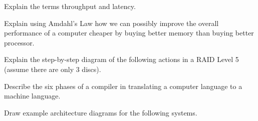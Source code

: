 \documentclass[12pt]{exam}
\begin{document}
\newpage
\begin{questions}

\question[20] Explain the terms throughput and latency. 
\addpoints

\question[20] 
Explain using Amdahl's Law  how we can possibly improve the overall performance of a computer  cheaper by buying better memory than buying better processor. 
\addpoints

\question [20] Explain the step-by-step diagram of the following actions in a RAID Level 5 (assume there are only 3 discs). 
\noaddpoints %
\addpoints


\question [20] 
Describe the six phases of a compiler in translating a computer language to a machine language. 
\addpoints

\question [5] Draw example architecture diagrams for the following systems.
\noaddpoints 
{}
\addpoints
\end{questions}
\end{document}
